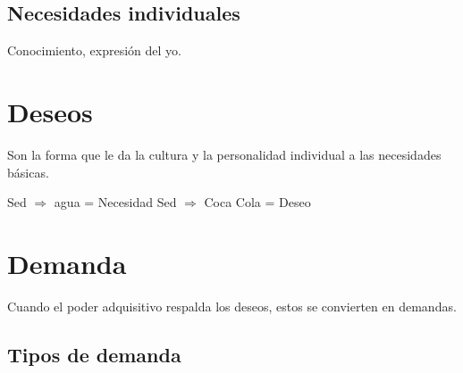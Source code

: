 \documentclass[12pt, spanish, a5paper]{article}
\begin{document}
\subsection{Necesidades individuales}
Conocimiento, expresión del yo.

\section{Deseos}
Son la forma que le da la cultura y la personalidad individual a las necesidades básicas.

Sed $\Rightarrow$ agua = Necesidad
Sed $\Rightarrow$ Coca Cola = Deseo

\section{Demanda}

Cuando el poder adquisitivo respalda los deseos, estos se convierten en demandas.

\subsection{Tipos de demanda}
\end{document}
